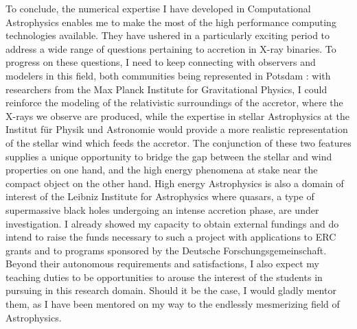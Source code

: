 \documentclass[a4paper,12pt,onecolumn]{article}
\begin{document}
To conclude, the numerical expertise I have developed in Computational Astrophysics enables me to make the most of the high performance computing technologies available. They have ushered in a particularly exciting period to address a wide range of questions pertaining to accretion in X-ray binaries. To progress on these questions, I need to keep connecting with observers and modelers in this field, both communities being represented in Potsdam : with researchers from the Max Planck Institute for Gravitational Physics, I could reinforce the modeling of the relativistic surroundings of the accretor, where the X-rays we observe are produced, while the expertise in stellar Astrophysics at the Institut für Physik und Astronomie would provide a more realistic representation of the stellar wind which feeds the accretor. The conjunction of these two features supplies a unique opportunity to bridge the gap between the stellar and wind properties on one hand, and the high energy phenomena at stake near the compact object on the other hand. High energy Astrophysics is also a domain of interest of the Leibniz Institute for Astrophysics where quasars, a type of supermassive black holes undergoing an intense accretion phase, are under investigation. I already showed my capacity to obtain external fundings and do intend to raise the funds necessary to such a project with applications to ERC grants and to programs sponsored by the Deutsche Forschungsgemeinschaft. Beyond their autonomous requirements and satisfactions, I also expect my teaching duties to be opportunities to arouse the interest of the students in pursuing in this research domain. Should it be the case, I would gladly mentor them, as I have been mentored on my way to the endlessly mesmerizing field of Astrophysics. 


%
%

\newpage

\setlength{\bibsep}{5pt}
\small



\newpage

\phantom{n}
\end{document}
